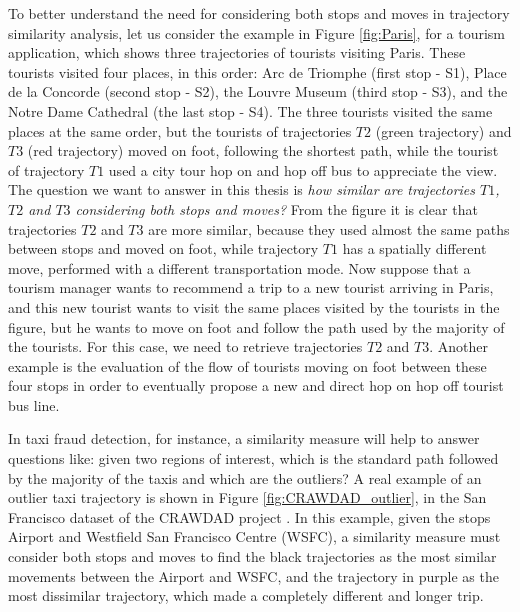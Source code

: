 {To better understand the need for considering both stops and moves in trajectory similarity analysis, let us consider the example in Figure \ref{fig:Paris}, for a tourism application, which shows three trajectories of tourists visiting Paris. These tourists visited four places, in this order:  Arc de Triomphe (first stop - S1), Place de la Concorde (second stop - S2), the Louvre Museum (third stop - S3), and the Notre Dame Cathedral (the last stop - S4). The three tourists visited the same places at the same order, but the tourists of trajectories $T2$ (green trajectory) and $T3$ (red trajectory) moved on foot, following the shortest path, while the tourist of trajectory $T1$ used a city tour hop on and hop off bus to appreciate the view. The question we want to answer in this thesis is \emph{how similar are trajectories $T1$, $T2$ and $T3$ considering both stops and moves?} From the figure it is clear that trajectories $T2$ and $T3$ are more similar, because they used almost the same paths between stops and moved on foot, while trajectory $T1$ has a spatially different move, performed with a different transportation mode. Now suppose that a tourism manager wants to recommend a trip to a new tourist arriving in Paris, and this new tourist wants to visit the same places visited by the tourists in the figure, but he wants to move on foot and follow the path used by the majority of the tourists.
For this case, we need to retrieve trajectories $T2$ and $T3$. 
Another example is the evaluation of the flow of tourists moving on foot between these four stops in order to eventually propose a new and direct hop on hop off tourist bus line.}

{In taxi fraud detection, for instance, a similarity measure will help to answer questions like: given two regions of interest, which is the standard path followed by the majority of the taxis and which are the outliers?
A real example of an outlier taxi trajectory is shown in Figure {\ref{fig:CRAWDAD_outlier}}, in the San Francisco dataset of the CRAWDAD project} \cite{epfl-mobility-20090224}. {In this example, given the stops Airport and  Westfield San Francisco Centre (WSFC), a similarity measure must consider both stops and moves to find the black trajectories as the most similar movements between the Airport and WSFC, and the trajectory in purple as the most dissimilar trajectory, which made a completely different and longer trip.}
 
